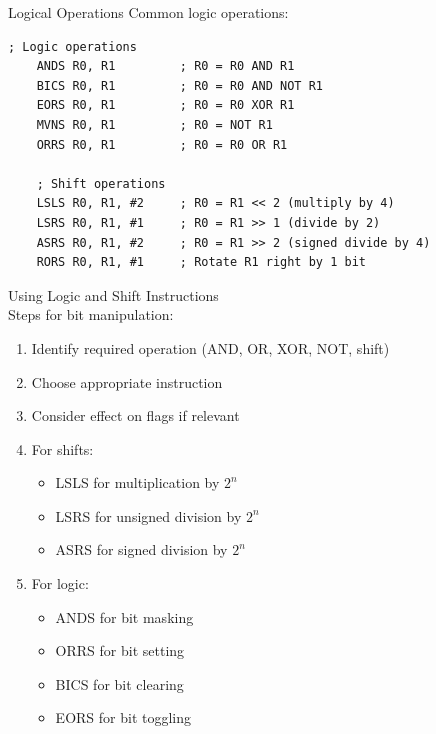 \begin{example2}{Logical Operations}
Common logic operations:
\begin{lstlisting}[language=armasm, style=basesmol]
    ; Logic operations
    ANDS R0, R1         ; R0 = R0 AND R1
    BICS R0, R1         ; R0 = R0 AND NOT R1
    EORS R0, R1         ; R0 = R0 XOR R1
    MVNS R0, R1         ; R0 = NOT R1
    ORRS R0, R1         ; R0 = R0 OR R1
    
    ; Shift operations
    LSLS R0, R1, #2     ; R0 = R1 << 2 (multiply by 4)
    LSRS R0, R1, #1     ; R0 = R1 >> 1 (divide by 2)
    ASRS R0, R1, #2     ; R0 = R1 >> 2 (signed divide by 4)
    RORS R0, R1, #1     ; Rotate R1 right by 1 bit
\end{lstlisting}
\end{example2}

\begin{KR}{Using Logic and Shift Instructions}\\
Steps for bit manipulation:
\begin{enumerate}
  \item Identify required operation (AND, OR, XOR, NOT, shift)
  \item Choose appropriate instruction
  \item Consider effect on flags if relevant
  \item For shifts:
    \begin{itemize}
      \item LSLS for multiplication by $2^n$
      \item LSRS for unsigned division by $2^n$
      \item ASRS for signed division by $2^n$
    \end{itemize}
  \item For logic:
    \begin{itemize}
      \item ANDS for bit masking
      \item ORRS for bit setting
      \item BICS for bit clearing
      \item EORS for bit toggling
    \end{itemize}
\end{enumerate}
\end{KR}